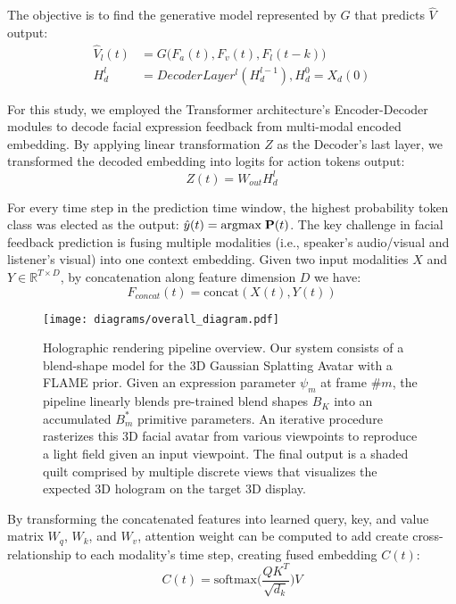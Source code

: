 \documentclass[a4paper,twocolumn]{article}
\begin{document}
The objective is to find the generative model represented by $G$ that predicts $\hat V$ output:
\begin{align*}
    \hat{V}_l(t) &= G\big(F_a(t), F_v(t), F_l(t-k)\big)\\
    H^l_d &= DecoderLayer^l(H^{l-1}_d), H^0_d = X_d(0)
\end{align*}

For this study, we employed the Transformer architecture's Encoder-Decoder modules to decode facial expression feedback from multi-modal encoded embedding. By applying linear transformation $Z$ as the Decoder's last layer, we transformed the decoded embedding into logits for action tokens output:
$$Z(t) = W_{out} H^l_d$$

For every time step in the prediction time window, the highest probability token class was elected as the output: $\hat{y}(t) = \text{argmax}\hspace{0.1cm}{\mathbf{P}(t)}$. The key challenge in facial feedback prediction is fusing multiple modalities (i.e., speaker's audio/visual and listener's visual) into one context embedding. Given two input modalities $X$ and $Y \in \mathbb{R}^{T\times D}$, by concatenation along feature dimension $D$ we have:
$$
F_{concat}(t) = \text{concat}(X(t),Y(t))
$$

\begin{figure*}[t!]
\centering
\texttt{[image: diagrams/overall\_diagram.pdf]}
\caption{\label{fig:offset_scheme}Holographic rendering pipeline overview. Our system consists of a blend-shape model for the 3D Gaussian Splatting Avatar with a FLAME prior. Given an expression parameter $\psi_m$ at frame $\#m$, the pipeline linearly blends pre-trained blend shapes ${B_K}$ into an accumulated $B^*_m$ primitive parameters. An iterative procedure rasterizes this 3D facial avatar from various viewpoints to reproduce a light field given an input viewpoint. The final output is a shaded quilt comprised by multiple discrete views that visualizes the expected 3D hologram on the target 3D display.}
\end{figure*}

By transforming the concatenated features into learned query, key, and value matrix $W_q$, $W_k$, and $W_v$, attention weight can be computed to add create cross-relationship to each modality's time step, creating fused embedding $C(t)$:
$$C(t) = \text{softmax}\big(\frac{QK^T}{\sqrt{d_k}}\big) V$$
\end{document}
